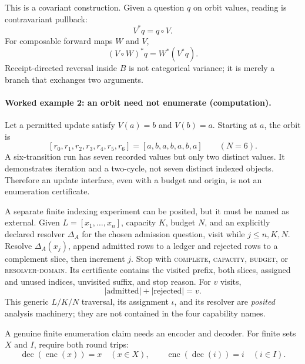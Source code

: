 This is a covariant construction.  Given a question \(q\) on orbit values, reading is contravariant pullback:
\[
                   V^*q=q\circ V.
\]
For composable forward maps \(W\) and \(V\),
\[
                   (V\circ W)^*q=W^*(V^*q).
\]
Receipt-directed reversal inside \(B\) is not categorical variance; it is merely a branch that exchanges two
arguments.

\paragraph{Worked example 2: an orbit need not enumerate (computation).}
Let a permitted update satisfy \(V(a)=b\) and \(V(b)=a\).  Starting at \(a\), the orbit is
\[
             [r_0,r_1,r_2,r_3,r_4,r_5,r_6]=[a,b,a,b,a,b,a]
             \qquad(N=6).
\]
A six-transition run has seven recorded values but only two distinct values.  It demonstrates iteration and a
two-cycle, not seven distinct indexed objects.  Therefore an update interface, even with a budget and origin, is not an enumeration
certificate.

A separate finite indexing experiment can be posited, but it must be named as external.  Given
\(L=[x_1,\ldots,x_n]\), capacity \(K\), budget \(N\), and an explicitly declared resolver \(\Delta_A\) for the chosen
admission question, visit while \(j\le n,K,N\).  Resolve \(\Delta_A(x_j)\), append admitted rows to a ledger and
rejected rows to a complement slice, then increment \(j\).  Stop with \textsc{complete}, \textsc{capacity},
\textsc{budget}, or \textsc{resolver-domain}.  Its certificate contains the visited prefix, both slices, assigned and
unused indices, unvisited suffix, and stop reason.  For \(v\) visits,
\[
                  |\text{admitted}|+|\text{rejected}|=v.
\]
This generic \(L/K/N\) traversal, its assignment \(\iota\), and its resolver are \emph{posited} analysis machinery;
they are not contained in the four capability names.

A genuine finite enumeration claim needs an encoder and decoder.  For finite sets \(X\) and \(I\), require both
round trips:
\[
             \operatorname{dec}(\operatorname{enc}(x))=x
             \quad(x\in X),\qquad
             \operatorname{enc}(\operatorname{dec}(i))=i
             \quad(i\in I).
\]

